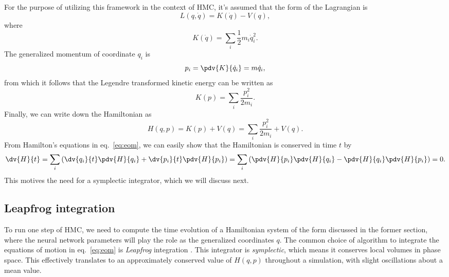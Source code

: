 For the purpose of utilizing this framework in the context of HMC, it's assumed that the form of the Lagrangian is
\begin{equation}
  L(q, \dot{q}) = K(\dot{q}) - V(q),
\end{equation}
where
\begin{equation}\label{eq:kinetic_energy}
  K(\dot{q}) = \sum_i \frac{1}{2}m_i\dot{q}^2_i.
\end{equation}
The generalized momentum of coordinate $q_i$ is
\begin{equation}
  p_i = \pdv{K}{\dot{q}_i} = m\dot{q}_i,
\end{equation}
from which it follows that the Legendre transformed kinetic energy can be written as
\begin{equation}\label{eq:kinetic_energy}
  K(p) = \sum_i \frac{p_i^2}{2m_i}.
\end{equation}
Finally, we can write down the Hamiltonian as
\begin{equation}\label{eq:hamiltonian}
  H(q, p) = K(p) + V(q) = \sum_i \frac{p_i^2}{2m_i} + V(q).
\end{equation}
From Hamilton's equations in eq.~\ref{eq:eom}, we can easily show that the Hamiltonian is conserved in time $t$ by
\begin{equation}
  \dv{H}{t} = \sum_i\left(\dv{q_i}{t}\pdv{H}{q_i} + \dv{p_i}{t}\pdv{H}{p_i}  \right)
  = \sum_i\left(\pdv{H}{p_i}\pdv{H}{q_i} - \pdv{H}{q_i}\pdv{H}{p_i}  \right) = 0.
\end{equation}
This motives the need for a symplectic integrator, which we will discuss next.

\subsection{Leapfrog integration}
To run one step of HMC, we need to compute the time evolution of a Hamiltonian system of the form discussed in the former section,
where the neural network parameters will play the role as the generalized coordinates $q$.
The common choice of algorithm to integrate the equations of motion in eq.~\eqref{eq:eom} is \textit{Leapfrog} integration \cite{leapfrog}. This integrator is \textit{symplectic}, which means it conserves local volumes in phase space. This effectively translates to an approximately conserved value of $H(q,p)$ throughout a simulation, with slight oscillations about a mean value.

